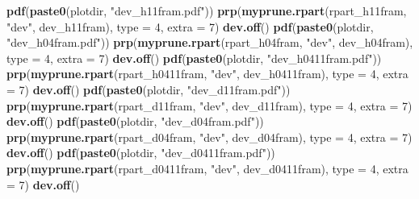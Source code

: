 \documentclass[11pt,]{article}
\newenvironment{Shaded}{\begin{snugshade}}{\end{snugshade}}
\newcommand{\KeywordTok}[1]{\textcolor[rgb]{0.13,0.29,0.53}{\textbf{{#1}}}}
\newcommand{\DataTypeTok}[1]{\textcolor[rgb]{0.13,0.29,0.53}{{#1}}}
\newcommand{\DecValTok}[1]{\textcolor[rgb]{0.00,0.00,0.81}{{#1}}}
\newcommand{\StringTok}[1]{\textcolor[rgb]{0.31,0.60,0.02}{{#1}}}
\newcommand{\NormalTok}[1]{{#1}}
\begin{document}
\begin{Shaded}
\begin{Highlighting}[]
{\KeywordTok{pdf}\NormalTok{(}\KeywordTok{paste0}\NormalTok{(plotdir, }\StringTok{"dev_h11fram.pdf"}\NormalTok{))}
\KeywordTok{prp}\NormalTok{(}\KeywordTok{myprune.rpart}\NormalTok{(rpart_h11fram, }\StringTok{"dev"}\NormalTok{, dev_h11fram), }\DataTypeTok{type =} \DecValTok{4}\NormalTok{, }\DataTypeTok{extra =} \DecValTok{7}\NormalTok{)}
\KeywordTok{dev.off}\NormalTok{()}
\KeywordTok{pdf}\NormalTok{(}\KeywordTok{paste0}\NormalTok{(plotdir, }\StringTok{"dev_h04fram.pdf"}\NormalTok{))}
\KeywordTok{prp}\NormalTok{(}\KeywordTok{myprune.rpart}\NormalTok{(rpart_h04fram, }\StringTok{"dev"}\NormalTok{, dev_h04fram), }\DataTypeTok{type =} \DecValTok{4}\NormalTok{, }\DataTypeTok{extra =} \DecValTok{7}\NormalTok{)}
\KeywordTok{dev.off}\NormalTok{()}
\KeywordTok{pdf}\NormalTok{(}\KeywordTok{paste0}\NormalTok{(plotdir, }\StringTok{"dev_h0411fram.pdf"}\NormalTok{))}
\KeywordTok{prp}\NormalTok{(}\KeywordTok{myprune.rpart}\NormalTok{(rpart_h0411fram, }\StringTok{"dev"}\NormalTok{, dev_h0411fram), }\DataTypeTok{type =} \DecValTok{4}\NormalTok{, }\DataTypeTok{extra =} \DecValTok{7}\NormalTok{)}
\KeywordTok{dev.off}\NormalTok{()}
\KeywordTok{pdf}\NormalTok{(}\KeywordTok{paste0}\NormalTok{(plotdir, }\StringTok{"dev_d11fram.pdf"}\NormalTok{))}
\KeywordTok{prp}\NormalTok{(}\KeywordTok{myprune.rpart}\NormalTok{(rpart_d11fram, }\StringTok{"dev"}\NormalTok{, dev_d11fram), }\DataTypeTok{type =} \DecValTok{4}\NormalTok{, }\DataTypeTok{extra =} \DecValTok{7}\NormalTok{)}
\KeywordTok{dev.off}\NormalTok{()}
\KeywordTok{pdf}\NormalTok{(}\KeywordTok{paste0}\NormalTok{(plotdir, }\StringTok{"dev_d04fram.pdf"}\NormalTok{))}
\KeywordTok{prp}\NormalTok{(}\KeywordTok{myprune.rpart}\NormalTok{(rpart_d04fram, }\StringTok{"dev"}\NormalTok{, dev_d04fram), }\DataTypeTok{type =} \DecValTok{4}\NormalTok{, }\DataTypeTok{extra =} \DecValTok{7}\NormalTok{)}
\KeywordTok{dev.off}\NormalTok{()}
\KeywordTok{pdf}\NormalTok{(}\KeywordTok{paste0}\NormalTok{(plotdir, }\StringTok{"dev_d0411fram.pdf"}\NormalTok{))}
\KeywordTok{prp}\NormalTok{(}\KeywordTok{myprune.rpart}\NormalTok{(rpart_d0411fram, }\StringTok{"dev"}\NormalTok{, dev_d0411fram), }\DataTypeTok{type =} \DecValTok{4}\NormalTok{, }\DataTypeTok{extra =} \DecValTok{7}\NormalTok{)}
\KeywordTok{dev.off}\NormalTok{()}

}
\end{Highlighting}
\end{Shaded}
\end{document}
